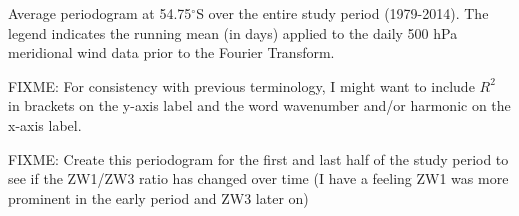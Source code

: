 \label{fig:fourier_spectrum}
Average periodogram at 54.75$^{\circ}$S over the entire study period (1979-2014). The legend indicates the running mean (in days) applied to the daily 500 hPa meridional wind data prior to the Fourier Transform. 

FIXME: For consistency with previous terminology, I might want to include $R^2$ in brackets on the y-axis label and the word wavenumber and/or harmonic on the x-axis label.

FIXME: Create this periodogram for the first and last half of the study period to see if the ZW1/ZW3 ratio has changed over time (I have a feeling ZW1 was more prominent in the early period and ZW3 later on)